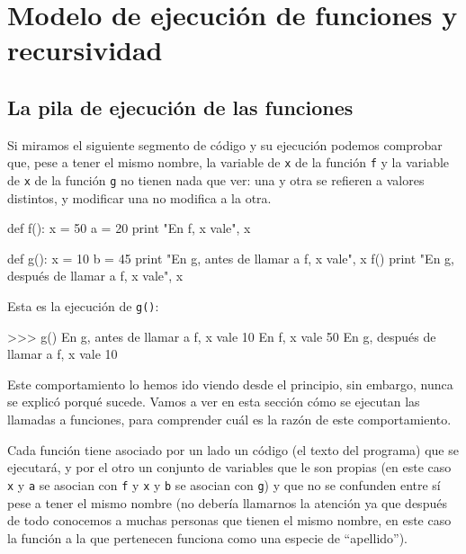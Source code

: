 \chapter{Modelo de ejecución de funciones y recursividad}

\section{La pila de ejecución de las funciones}


Si miramos el siguiente segmento de código y su ejecución podemos comprobar
que, pese a tener el mismo nombre, la variable de \lstinline!x! de la función
\lstinline!f! y la variable de \lstinline!x! de la función \lstinline!g! no
tienen nada que ver: una y otra se refieren a valores distintos, y modificar
una no modifica a la otra.

\begin{codigo-python-sn}
def f():
    x = 50
    a = 20
    print "En f, x vale", x

def g():
    x = 10
    b = 45
    print "En g, antes de llamar a f, x vale", x
    f()
    print "En g, después de llamar a f, x vale", x
\end{codigo-python-sn}

Esta es la ejecución de \lstinline!g()!:

\begin{codigo-python-sn}
>>> g()
En g, antes de llamar a f, x vale 10
En f, x vale 50
En g, después de llamar a f, x vale 10
\end{codigo-python-sn}

Este comportamiento lo hemos ido viendo desde el principio, sin embargo,
nunca se explicó porqué sucede.  Vamos a ver en esta sección cómo se
ejecutan las llamadas a funciones, para comprender cuál es la razón de este
comportamiento.

Cada función tiene asociado por un lado un código (el texto del programa)
que se ejecutará, y por el otro un conjunto de variables que le son propias
(en este caso \lstinline!x! y \lstinline!a! se asocian con \lstinline!f! y
\lstinline!x! y \lstinline!b! se asocian con \lstinline!g!) y que no se
confunden entre sí pese a tener el mismo nombre (no debería llamarnos la
atención ya que después de todo conocemos a muchas personas que tienen el
mismo nombre, en este caso la función a la que pertenecen funciona como una
especie de ``apellido'').

